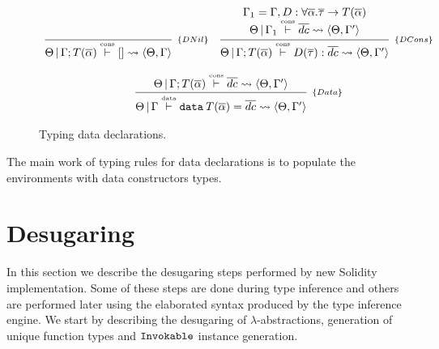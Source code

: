 \documentclass[a4paper, 11pt]{article}
\begin{document}
\begin{figure}[H]
  \[
    \begin{array}{cc}
      \infer[_{\{DNil\}}]
            {\Theta\,|\,\Gamma ; T(\overline{\alpha})\typing{cons} [] \leadsto \langle \Theta, \Gamma \rangle}
            {}
      &
      \infer[_{\{DCons\}}]
            {\Theta\,|\,\Gamma ; T(\overline{\alpha}) \typing{cons} D(\overline{\tau}) : \overline{dc}\leadsto \langle \Theta, \Gamma' \rangle }
            {\begin{array}{c}
              \Gamma_1 = \Gamma, D : \forall \overline{\alpha} . \overline{\tau} \to T(\overline{\alpha})\\
              \Theta\,|\,\Gamma_1 \typing{cons} \overline{dc} \leadsto \langle \Theta, \Gamma' \rangle  
             \end{array}}
      \\ \\
      \multicolumn{2}{c}{
        \infer[_{\{Data\}}]
              {\Theta\,|\,\Gamma \typing{data} \mathtt{data}\:T(\overline{\alpha}) = \overline{dc} \leadsto \langle \Theta, \Gamma' \rangle}
              {\Theta\,|\,\Gamma ; T(\overline{\alpha})\typing{cons} \overline{dc} \leadsto \langle \Theta, \Gamma' \rangle}
      }
    \end{array}
  \]
  \centering
  \caption{Typing data declarations.}
  \label{fig:datatyping}
\end{figure}

The main work of typing rules for data declarations is to populate the 
environments with data constructors types.


\section{Desugaring}\label{sec:desugar} 

In this section we describe the desugaring steps performed by new 
Solidity implementation. Some of these steps are done during type inference 
and others are performed later using the elaborated syntax produced by 
the type inference engine. We start by describing the desugaring 
of $\lambda$-abstractions, generation of unique function types and 
$\mathtt{Invokable}$ instance generation.
\end{document}
